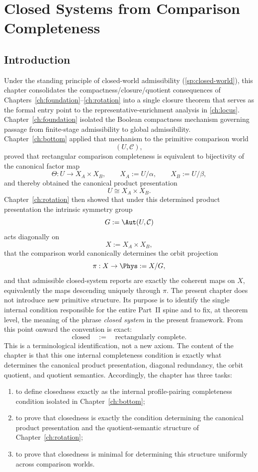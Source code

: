 \chapter{Closed Systems from Comparison Completeness}
\label{ch:closure}
\section{Introduction}
Under the standing principle of closed-world admissibility
(\cref{sp:closed-world}), this chapter consolidates the
compactness/closure/quotient consequences of
Chapters~\ref{ch:foundation}--\ref{ch:rotation} into a single closure
theorem that serves as the formal entry point to the
representative-enrichment analysis in \cref{ch:locus}.
Chapter~\ref{ch:foundation} isolated the Boolean compactness mechanism
governing passage from finite-stage admissibility to global
admissibility. Chapter~\ref{ch:bottom} applied that mechanism to the
primitive comparison world
\[
	(U,\mathcal C),
\]
proved that rectangular comparison completeness is equivalent to
bijectivity of the canonical factor map
\[
	\Theta:U\to X_A\times X_B,
	\qquad
	X_A:=U/\alpha,
	\qquad
	X_B:=U/\beta,
\]
and thereby obtained the canonical product presentation
\[
	U\cong X_A\times X_B.
\]
Chapter~\ref{ch:rotation} then showed that under this determined product
presentation the intrinsic symmetry group
\[
	G:=\Aut(U,\mathcal C)
\]
acts diagonally on
\[
	X:=X_A\times X_B,
\]
that the comparison world canonically determines the orbit projection
\[
	\pi:X\to\Phys:=X/G,
\]
and that admissible closed-system reports are exactly the coherent maps
on \(X\), equivalently the maps descending uniquely through \(\pi\).
The present chapter does not introduce new primitive structure. Its
purpose is to identify the single internal condition responsible for the
entire Part~II spine and to fix, at theorem level, the meaning of the
phrase \emph{closed system} in the present framework.
From this point onward the convention is exact:
\[
	\text{closed}
	\quad:=\quad
	\text{rectangularly complete}.
\]
This is a terminological identification, not a new axiom. The content of
the chapter is that this one internal completeness condition is exactly
what determines the canonical product presentation, diagonal redundancy, the
orbit quotient, and quotient semantics.
Accordingly, the chapter has three tasks:
\begin{enumerate}[label=\textup{(\roman*)}]
	\item
	      to define closedness exactly as the internal profile-pairing
	      completeness condition isolated in Chapter~\ref{ch:bottom};
	\item
	      to prove that closedness is exactly the condition determining the canonical
	      product presentation and the quotient-semantic structure of
	      Chapter~\ref{ch:rotation};
	\item
	      to prove that closedness is minimal for determining this structure
	      uniformly across comparison worlds.
\end{enumerate}
